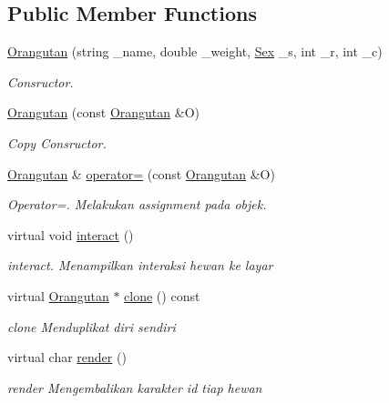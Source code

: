 \subsection*{Public Member Functions}
\begin{DoxyCompactItemize}
\item 
\hyperlink{classOrangutan_a8045cd2c8d32a3be4e003cc05973e164}{Orangutan} (string \+\_\+name, double \+\_\+weight, \hyperlink{sex_8h_a2633cb393c68bb2ee8080db58fb7ba93}{Sex} \+\_\+s, int \+\_\+r, int \+\_\+c)
\begin{DoxyCompactList}\small\item\em Consructor. \end{DoxyCompactList}\item 
\hyperlink{classOrangutan_a638f8c50147a51e9fd8ba8a60b4b1e43}{Orangutan} (const \hyperlink{classOrangutan}{Orangutan} \&O)
\begin{DoxyCompactList}\small\item\em Copy Consructor. \end{DoxyCompactList}\item 
\hyperlink{classOrangutan}{Orangutan} \& \hyperlink{classOrangutan_abb5655e1d588f3f8390224ba4cf6e5fc}{operator=} (const \hyperlink{classOrangutan}{Orangutan} \&O)
\begin{DoxyCompactList}\small\item\em Operator=. Melakukan assignment pada objek. \end{DoxyCompactList}\item 
virtual void \hyperlink{classOrangutan_abd71dc2a59a85f5b2d358d6509589fc4}{interact} ()
\begin{DoxyCompactList}\small\item\em interact. Menampilkan interaksi hewan ke layar \end{DoxyCompactList}\item 
virtual \hyperlink{classOrangutan}{Orangutan} $\ast$ \hyperlink{classOrangutan_a58ca36d261bc661415f82c751f6d24b0}{clone} () const 
\begin{DoxyCompactList}\small\item\em clone Menduplikat diri sendiri \end{DoxyCompactList}\item 
virtual char \hyperlink{classOrangutan_a2a73ceba0a3143dd3b16955fb5bb6a29}{render} ()
\begin{DoxyCompactList}\small\item\em render Mengembalikan karakter id tiap hewan \end{DoxyCompactList}\item 

\end{DoxyCompactItemize}
